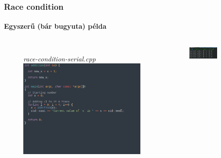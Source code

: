 \begin{frame}
\frametitle{Race condition}
\framesubtitle{Egyszerű (bár bugyuta) példa}

\begin{columns}
	\begin{figure}
		{\centering\small\textit{race-condition-serial.cpp}}
		\includegraphics[width=\textwidth]{img/race-cond-ser.png}	
	\end{figure}
	\vspace*{-15pt}
	\begin{figure}
		\includegraphics[width=0.7\textwidth]{img/race-cond-ser-output.png}
	\end{figure}
	

\end{columns}
\end{frame}
